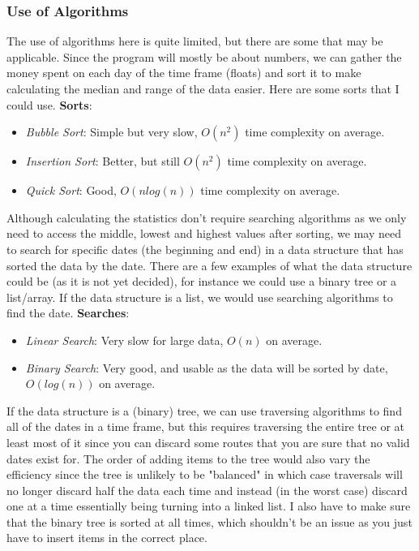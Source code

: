 \documentclass{article}
\begin{document}
\subsubsection{Use of Algorithms}
The use of algorithms here is quite limited, but there are some that may be applicable.
Since the program will mostly be about numbers, we can gather the money spent on each day of the time frame (floats) and sort it to make calculating the median and range of the data easier. \newline
Here are some sorts that I could use. \newline
\textbf{Sorts}:
\begin{itemize}
    \item \textit{Bubble Sort}: Simple but very slow, $O(n^2)$ time complexity on average.
    \item \textit{Insertion Sort}: Better, but still $O(n^2)$ time complexity on average.
    \item \textit{Quick Sort}: Good, $O(nlog(n))$ time complexity on average.
\end{itemize}
Although calculating the statistics don't require searching algorithms as we only need to access the middle, lowest and highest values after sorting, we may need to search for specific dates (the beginning and end) in a data structure that has sorted the data by the date. There are a few examples of what the data structure could be (as it is not yet decided), for instance we could use a binary tree or a list/array.\newline
If the data structure is a list, we would use searching algorithms to find the date. \newline
\textbf{Searches}:
\begin{itemize}
    \item \textit{Linear Search}: Very slow for large data, $O(n)$ on average.
    \item \textit{Binary Search}: Very good, and usable as the data will be sorted by date, $O(log(n))$ on average.
\end{itemize}
If the data structure is a (binary) tree, we can use traversing algorithms to find all of the dates in a time frame, but this requires traversing the entire tree or at least most of it since you can discard some routes that you are sure that no valid dates exist for. The order of adding items to the tree would also vary the efficiency since the tree is unlikely to be "balanced" in which case traversals will no longer discard half the data each time and instead (in the worst case) discard one at a time essentially being turning into a linked list. I also have to make sure that the binary tree is sorted at all times, which shouldn't be an issue as you just have to insert items in the correct place. \newline
\end{document}
